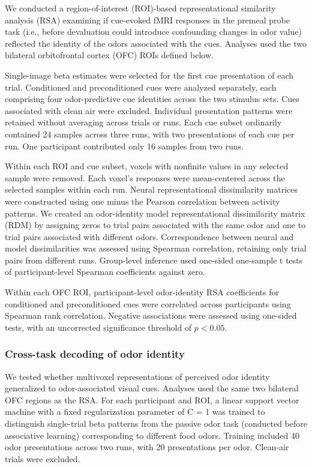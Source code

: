 \documentclass[9pt,twoside,lineno]{pnas-new}
\begin{document}
We conducted a region-of-interest (ROI)-based representational similarity analysis (RSA) examining if cue-evoked fMRI responses in the premeal probe task (i.e., before devaluation could introduce confounding changes in odor value) reflected the identity of the odors associated with the cues. Analyses used the two bilateral orbitofrontal cortex (OFC) ROIs defined below.

Single-image beta estimates were selected for the first cue presentation of each trial. Conditioned and preconditioned cues were analyzed separately, each comprising four odor-predictive cue identities across the two stimulus sets. Cues associated with clean air were excluded. Individual presentation patterns were retained without averaging across trials or runs. Each cue subset ordinarily contained 24 samples across three runs, with two presentations of each cue per run. One participant contributed only 16 samples from two runs.

Within each ROI and cue subset, voxels with nonfinite values in any selected sample were removed. Each voxel’s responses were mean-centered across the selected samples within each run. Neural representational dissimilarity matrices were constructed using one minus the Pearson correlation between activity patterns. We created an odor-identity model representational dissimilarity matrix (RDM) by assigning zeros to trial pairs associated with the same odor and one to trial pairs associated with different odors. Correspondence between neural and model dissimilarities was assessed using Spearman correlation, retaining only trial pairs from different runs. Group-level inference used one-sided one-sample t tests of participant-level Spearman coefficients against zero.

Within each OFC ROI, participant-level odor-identity RSA coefficients for conditioned and preconditioned cues were correlated across participants using Spearman rank correlation. Negative associations were assessed using one-sided tests, with an uncorrected significance threshold of $p < 0.05$.

\subsubsection*{Cross-task decoding of odor identity}

We tested whether multivoxel representations of perceived odor identity generalized to odor-associated visual cues. Analyses used the same two bilateral OFC regions as the RSA. For each participant and ROI, a linear support vector machine with a fixed regularization parameter of C = 1 was trained to distinguish single-trial beta patterns from the passive odor task (conducted before associative learning) corresponding to different food odors. Training included 40 odor presentations across two runs, with 20 presentations per odor. Clean-air trials were excluded.
\end{document}
